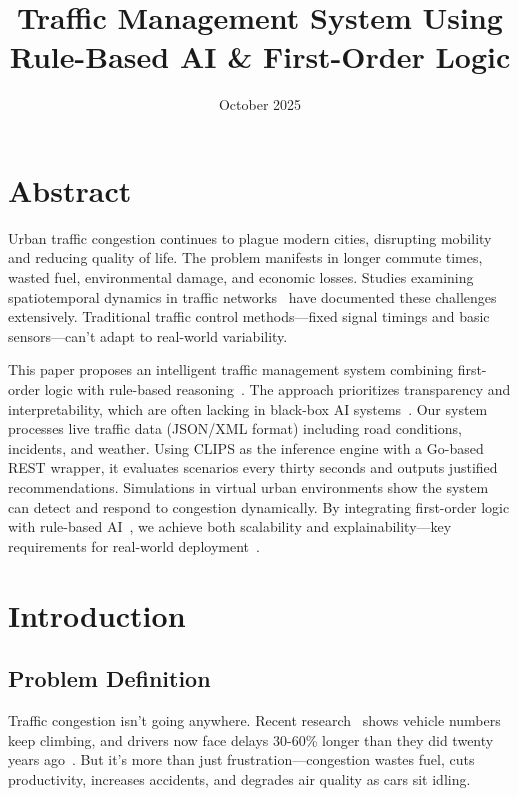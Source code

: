 \documentclass{article}
\title{Traffic Management System Using Rule-Based AI \& First-Order Logic}
\date{October 2025}
\begin{document}
\maketitle

\section*{Abstract}
Urban traffic congestion continues to plague modern cities, disrupting mobility and reducing quality of life. The problem manifests in longer commute times, wasted fuel, environmental damage, and economic losses. Studies examining spatiotemporal dynamics in traffic networks~\cite{jiang_spatiotemporal_2017, epj_scaling_2024} have documented these challenges extensively. Traditional traffic control methods—fixed signal timings and basic sensors—can't adapt to real-world variability. 

This paper proposes an intelligent traffic management system combining first-order logic with rule-based reasoning~\cite{xu_consistency_2006}. The approach prioritizes transparency and interpretability, which are often lacking in black-box AI systems~\cite{russell_ai_2009}. Our system processes live traffic data (JSON/XML format) including road conditions, incidents, and weather. Using CLIPS as the inference engine with a Go-based REST wrapper, it evaluates scenarios every thirty seconds and outputs justified recommendations. Simulations in virtual urban environments show the system can detect and respond to congestion dynamically. By integrating first-order logic with rule-based AI~\cite{spillo_neuro_symbolic_2024}, we achieve both scalability and explainability—key requirements for real-world deployment~\cite{karagiannis_wissensmanagement_2001, karagiannis_domain_2016}.

\newpage
\tableofcontents
\newpage

\section{Introduction}

\subsection{Problem Definition}
Traffic congestion isn't going anywhere. Recent research~\cite{jiang_spatiotemporal_2017} shows vehicle numbers keep climbing, and drivers now face delays 30-60\% longer than they did twenty years ago~\cite{epj_scaling_2024}. But it's more than just frustration—congestion wastes fuel, cuts productivity, increases accidents, and degrades air quality as cars sit idling.
\end{document}

